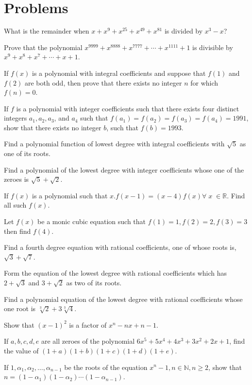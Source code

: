 \section{Problems}
\startitemize[n, 1*broad]
\item What is the remainder when $x + x^9 + x^{25} + x^{49} + x^{81}$ is divided by $x^3 - x$?
\item Prove that the polynomial $x^{9999} + x^{8888} + x^{7777} + \cdots + x^{1111} + 1$ is divisible by
  $x^9 + x^8 + x^7 + \cdots + x + 1$.
\item If $f(x)$ is a polynomial with integral coefficients and suppose that $f(1)$ and $f(2)$ are both odd,
  then prove that there exists no integer $n$ for which $f(n) = 0$.
\item If $f$ is a polynomial with integer coefficients such that there exists four distinct integers $a_1,
  a_2, a_3$, and $a_4$ such that $f(a_1) = f(a_2) = f(a_3) = f(a_4) = 1991$, show that there exists no
  integer $b$, such that $f(b) = 1993$.
\item Find a polynomial function of lowest degree with integral coefficients with $\sqrt{5}$ as one of its
  roots.
\item Find a polynomial of the lowest degree with integer coefficients whose one of the zeroes is $\sqrt{5}
  + \sqrt{2}$.
\item If $f(x)$ is a polynomial such that $x.f(x - 1) = (x - 4)f(x)\forall\;x\;\in\mathbb{R}$. Find all
  such $f(x)$.
\item Let $f(x)$ be a monic cubic equation such that $f(1) = 1, f(2) = 2, f(3) = 3$ then find $f(4)$.
\item Find a fourth degree equation with rational coefficients, one of whose roots is, $\sqrt{3} +
  \sqrt{7}$.
\item Form the equation of the lowest degree with rational coefficients which has $2 + \sqrt{3}$ and $3 +
  \sqrt{2}$ as two of its roots.
\item Find a polynomial equation of the lowest degree with rational coefficients whose one root is
  $\sqrt[3]{2} + 3\sqrt[3]{4}$.
\item Show that $(x - 1)^2$ is a factor of $x^n - nx + n - 1$.
\item If $a, b, c, d, e$ are all zeroes of the polynomial $6x^5 + 5x^4 + 4x^3 + 3x^2 + 2x + 1$, find the
  value of $(1 + a)(1 + b)(1 + c)(1 + d)(1 + e)$.
\item If $1, \alpha_1, \alpha_2, \ldots, \alpha_{n - 1}$ be the roots of the equation $x^n - 1,
  n\in\mathbb{N}, n\geq 2$, show that $n = (1 - \alpha_1)(1 - \alpha_2)\cdots(1 - \alpha_{n - 1})$.
